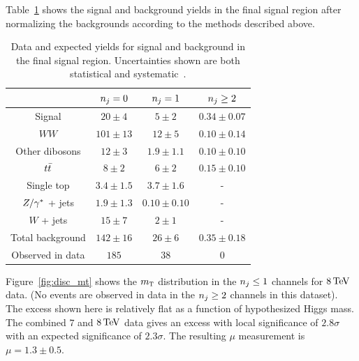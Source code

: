 Table~\ref{tab:disc_ww_results} shows the signal and background yields in the final signal region after normalizing the backgrounds according to the methods described above. 

\begin{table}[h!]
\centering
\captionsetup{justification=centering}

\hspace{-10pt}
\begin{tabular}{|c|c|c|c|}
\hline
& $n_j = 0$ & $n_j = 1$ & $n_j \geq 2$\\ \hline
Signal & $20 \pm 4$ & $5 \pm 2$ & $0.34 \pm 0.07$ \\ \hline
$WW$ & $101 \pm 13$ & $12 \pm 5$ & $0.10 \pm 0.14$ \\ 
Other dibosons & $12 \pm 3$ & $1.9 \pm 1.1$ & $0.10 \pm 0.10$ \\ 
$t\bar{t}$ & $8 \pm 2$ & $6 \pm 2$ & $0.15 \pm 0.10$ \\ 
Single top & $3.4 \pm 1.5$ & $3.7 \pm 1.6$ & - \\ 
$Z/\gamma^{\ast}$ + jets & $1.9 \pm 1.3$ & $0.10 \pm 0.10$ & - \\ 
$W$ + jets & $15 \pm 7$ & $2 \pm 1$ & - \\ \hline
Total background & $142 \pm 16$ & $26 \pm 6$ & $0.35 \pm 0.18$ \\ \hline
Observed in data & $185$ & $38$ & $0$ \\ \hline
\end{tabular}

\caption{
Data and expected yields for signal and background in the final \HWWfull signal region. Uncertainties shown are both statistical and systematic~\cite{Discovery}.
}
\label{tab:disc_ww_results}
\end{table}

Figure~\ref{fig:disc_mt} shows the $m_{\textrm{\footnotesize\sc t}}$ distribution in the $n_j \leq 1$ channels for $8 \TeV$ data. (No events are observed in data in the $n_j \geq 2$ channels in this dataset). The excess shown here is relatively flat as a function of hypothesized Higgs mass. The combined $7$ and $8\TeV$ data gives an excess with local significance of $2.8\sigma$ with an expected significance of $2.3\sigma$. The resulting $\mu$ measurement is $\mu = 1.3\pm 0.5$. 

